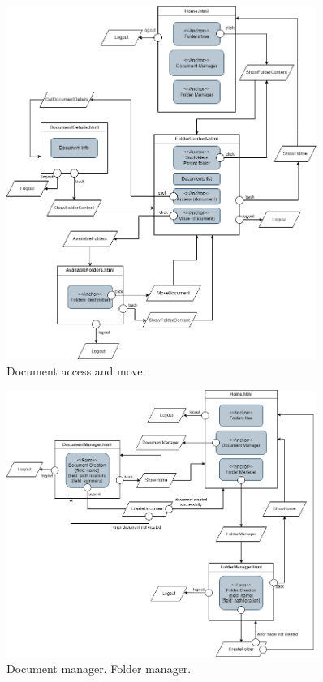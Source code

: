 \documentclass[a4paper,12pt]{article}
\begin{document}
\begin{figure}[H]
    \centering
    \includegraphics[width=0.9\textwidth]{HTML/HTMLDocumentAccessMove.png}
    \caption{Document access and move.}
\end{figure}

\begin{figure}[H]
    \centering
    \includegraphics[width=0.9\textwidth]{HTML/HTMLFolderDocumentManager.png}
    \caption{Document manager. Folder manager.}
\end{figure}
\newpage
\end{document}
